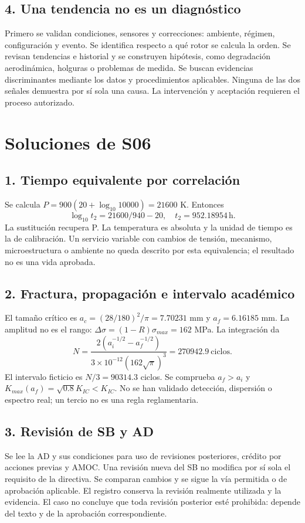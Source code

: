 
\section{4. Una tendencia no es un diagnóstico}
Primero se validan condiciones, sensores y correcciones: ambiente, régimen, configuración y evento. Se identifica respecto a qué rotor se calcula la orden. Se revisan tendencias e historial y se construyen hipótesis, como degradación aerodinámica, holguras o problemas de medida. Se buscan evidencias discriminantes mediante los datos y procedimientos aplicables. Ninguna de las dos señales demuestra por sí sola una causa. La intervención y aceptación requieren el proceso autorizado.

\chapter{Soluciones de S06}
\section{1. Tiempo equivalente por correlación}
Se calcula $P=900(20+\log_{10}10000)=21600$ K. Entonces
\[\log_{10}t_2=21600/940-20,\quad t_2=952.18954\,\mathrm h.\]
La sustitución recupera P. La temperatura es absoluta y la unidad de tiempo es la de calibración. Un servicio variable con cambios de tensión, mecanismo, microestructura o ambiente no queda descrito por esta equivalencia; el resultado no es una vida aprobada.



\section{2. Fractura, propagación e intervalo académico}
El tamaño crítico es $ a_c=(28/180)^2/\pi=7.70231$ mm y $ a_f=6.16185$ mm. La amplitud no es el rango: $\Delta\sigma=(1-R)\sigma_{max}=162$ MPa. La integración da
\[N=\frac{2(a_i^{-1/2}-a_f^{-1/2})}{3\times10^{-12}(162\sqrt\pi)^3}=270942.9\ \text{ciclos}.\]
El intervalo ficticio es $N/3=90314.3$ ciclos. Se comprueba $ a_f>a_i $ y $K_{max}(a_f)=\sqrt{0.8}K_{IC}<K_{IC}$. No se han validado detección, dispersión o espectro real; un tercio no es una regla reglamentaria.



\section{3. Revisión de SB y AD}
Se lee la AD y sus condiciones para uso de revisiones posteriores, crédito por acciones previas y AMOC. Una revisión nueva del SB no modifica por sí sola el requisito de la directiva. Se comparan cambios y se sigue la vía permitida o de aprobación aplicable. El registro conserva la revisión realmente utilizada y la evidencia. El caso no concluye que toda revisión posterior esté prohibida: depende del texto y de la aprobación correspondiente.

